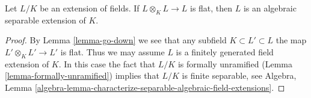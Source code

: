 \begin{lemma}
\label{lemma-absolutely-flat-fields}
Let $L/K$ be an extension of fields. If $L \otimes_K L \to L$
is flat, then $L$ is an algebraic separable extension of $K$.
\end{lemma}

\begin{proof}
By Lemma \ref{lemma-go-down} we see that any subfield
$K \subset L' \subset L$ the map $L' \otimes_K L' \to L'$ is flat.
Thus we may assume $L$ is a finitely generated field extension of $K$.
In this case the fact that $L/K$ is formally unramified
(Lemma \ref{lemma-formally-unramified})
implies that $L/K$ is finite separable, see Algebra, Lemma
\ref{algebra-lemma-characterize-separable-algebraic-field-extensions}.
\end{proof}
